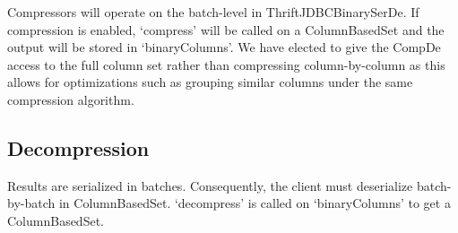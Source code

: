 \documentclass[11pt,a4paper]{article}
\begin{document}
		Compressors will operate on the batch-level in ThriftJDBCBinarySerDe.
		If compression is enabled, `compress' will be called on a ColumnBasedSet and the output will be stored in `binaryColumns'.
		We have elected to give the CompDe access to the full column set rather than compressing column-by-column as this allows for optimizations such as grouping similar columns under the same compression algorithm.
		
		\subsection{Decompression}
		Results are serialized in batches.
		Consequently, the client must deserialize batch-by-batch in ColumnBasedSet.
		`decompress' is called on `binaryColumns' to get a ColumnBasedSet.
		
\end{document}
